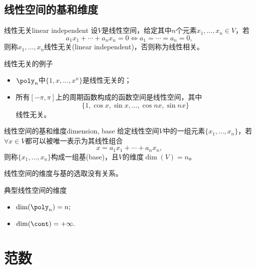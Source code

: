 \subsection{线性空间的基和维度}

\begin{definition}
    {线性无关}{linear independent}
    设$V$是线性空间，给定其中$n$个元素$x_1,\ldots,x_n\in V$，若%
    \begin{equation}
        a_1x_1+\cdots+a_nx_n=0\iff a_1=\cdots=a_n=0,
    \end{equation}
    则称$x_1,\ldots,x_n$线性无关(linear independent)，否则称为线性相关。
\end{definition}

\begin{example}
    {线性无关的例子}{}
    \begin{itemize}
        \item $\poly_n$中$\{1,x,\ldots,x^n\}$是线性无关的；
        \item 所有$[-\pi,\pi]$上的周期函数构成的函数空间是线性空间，其中
        \[
            \{1,\cos x,\sin x,\ldots,\cos nx,\sin nx\} 
        \]
        线性无关。
    \end{itemize}
\end{example}

\begin{definition}
    {线性空间的基和维度}{dimension, base}
    给定线性空间$V$中的一组元素$\{x_1,\ldots,x_n\}$，若$\forall x\in V$都可以被唯一表示为其线性组合
    \begin{equation}
        x=a_1x_1+\cdots+a_nx_n,
    \end{equation}
    则称$\{x_1,\ldots,x_n\}$构成一组基(base)，且$V$的维度$\dim(V)=n$。
\end{definition}

\begin{theorem}
    {}{}
    线性空间的维度与基的选取没有关系。
\end{theorem}

\begin{example}
    {典型线性空间的维度}{}
    \begin{itemize}
        \item $\dim(\poly_n)=n;$
        \item $\dim(\cont)=+\infty.$
    \end{itemize}
\end{example}

\section{范数}
\label{sec:norm}

